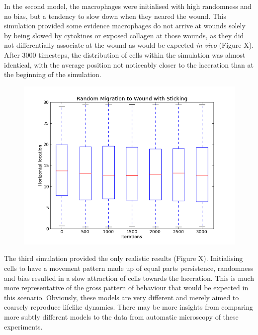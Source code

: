 \documentclass[12pt]{article}
\begin{document}
In the second model, the macrophages were initialised with high 
randomness and no bias, but a tendency to slow down when they neared the 
wound. This simulation provided some evidence macrophages do not arrive 
at wounds solely by being slowed by cytokines or exposed collagen at 
those wounds, as they did not differentially associate at the wound as 
would be expected {\itshape in vivo} (Figure X). After 3000 timesteps, 
the distribution of cells within the simulation was almost identical, 
with the average position not noticeably closer to the laceration than 
at the beginning of the simulation.\begin{figure}[H]
\centering
\includegraphics[width=14.51cm]{media/RandomMigrationtoWound.png}
\end{figure}

The third simulation provided the only realistic results (Figure X). 
Initialising cells to have a movement pattern made up of equal parts 
persistence, randomness and bias resulted in a slow attraction of cells 
towards the laceration. This is much more representative of the gross 
pattern of behaviour that would be expected in this scenario. Obviously, 
these models are very different and merely aimed to coarsely reproduce 
lifelike dynamics. There may be more insights from comparing more subtly 
different models to the data from automatic microscopy of these 
experiments.
\end{document}
